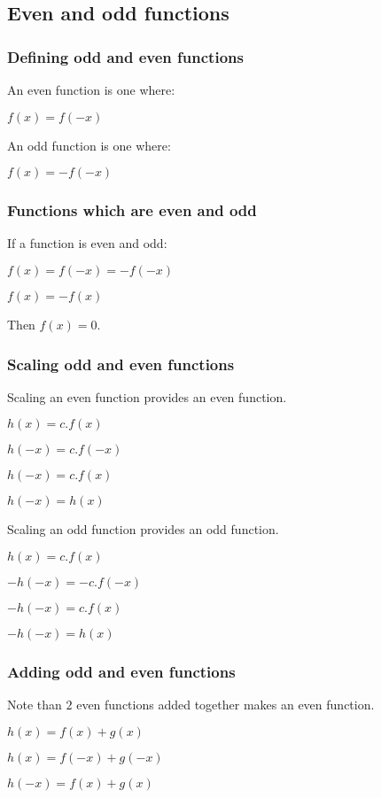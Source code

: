 
\subsection{Even and odd functions}

\subsubsection{Defining odd and even functions}

An even function is one where:

$f(x)=f(-x)$

An odd function is one where:

$f(x)=-f(-x)$

\subsubsection{Functions which are even and odd}

If a function is even and odd:

$f(x)=f(-x)=-f(-x)$

$f(x)=-f(x)$

Then \(f(x)=0\).
\subsubsection{Scaling odd and even functions}

Scaling an even function provides an even function.

$h(x)=c.f(x)$

$h(-x)=c.f(-x)$

$h(-x)=c.f(x)$

$h(-x)=h(x)$

Scaling an odd function provides an odd function.

$h(x)=c.f(x)$

$-h(-x)=-c.f(-x)$

$-h(-x)=c.f(x)$

$-h(-x)=h(x)$

\subsubsection{Adding odd and even functions}

Note than \(2\) even functions added together makes an even function.

$h(x)=f(x)+g(x)$

$h(x)=f(-x)+g(-x)$

$h(-x)=f(x)+g(x)$

